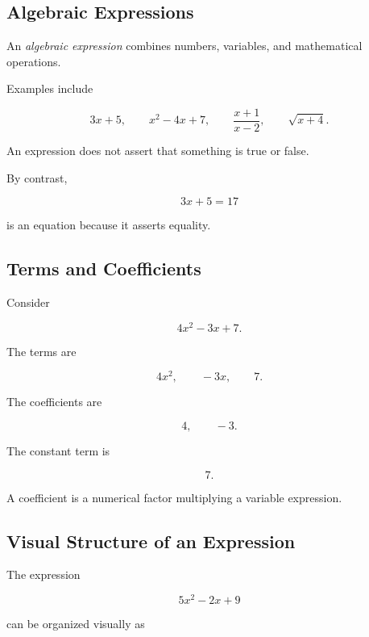 \subsection{Algebraic Expressions}
\label{subsec:algebraic-expressions}

An \emph{algebraic expression} combines numbers, variables, and mathematical
operations.

Examples include

\[ 3x+5,\qquad x^2-4x+7,\qquad \frac{x+1}{x-2},\qquad \sqrt{x+4}. \]

An expression does not assert that something is true or false.

By contrast,

\[ 3x+5=17 \]

is an equation because it asserts equality.

\subsection{Terms and Coefficients}
\label{subsec:terms-and-coefficients}

Consider

\[ 4x^2-3x+7. \]

The terms are

\[ 4x^2,\qquad -3x,\qquad 7. \]

The coefficients are

\[ 4,\qquad -3. \]

The constant term is

\[ 7. \]

A coefficient is a numerical factor multiplying a variable expression.

\subsection{Visual Structure of an Expression}
\label{subsec:visual-expression-structure}

The expression

\[ 5x^2-2x+9 \]

can be organized visually as

\begin{center}
\end{center}

